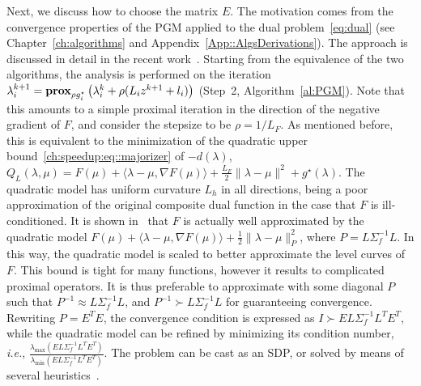 \documentclass[openany]{now}
\newcommand{\ie}{{\it i.e.}}
\newcommand{\prox}{\mathop{\bf prox}}
\begin{document}
  Next, we discuss how to choose the matrix $E$. The motivation comes from the convergence properties of the PGM applied to the dual problem~\eqref{eq:dual} (see Chapter~\ref{ch:algorithms} and Appendix~\ref{App::AlgsDerivations}). The approach is discussed in detail in the recent work~\cite{Giselsson:fbds}. Starting from the equivalence of the two algorithms, the analysis is performed on the iteration $\lambda_i^{k+1} = \prox_{\rho g_i^\star}\left(\lambda_i^k+\rho(L_iz^{k+1}+l_i)\right)$ (Step~2, Algorithm~\ref{al:PGM}). Note that this amounts to a simple proximal iteration in the direction of the negative gradient of $F$, and consider the stepsize to be $\rho=1/L_F$. As mentioned before, this is equivalent to the minimization of the quadratic upper bound~\eqref{ch:speedup:eq::majorizer} of $-d(\lambda)$, $Q_L(\lambda,\mu) = F(\mu) + \langle \lambda-\mu,\nabla F(\mu)\rangle + \frac{L_F}{2}\|\lambda-\mu\|^2 + g^\star(\lambda)$. The quadratic model has uniform curvature $L_h$ in all directions, being a poor approximation of the original composite dual function in the case that $F$ is ill-conditioned. It is shown in~\cite[Proposition~29]{Giselsson:fbds} that $F$ is actually well approximated by the quadratic model $F(\mu) + \langle \lambda-\mu,\nabla F(\mu)\rangle + \frac{1}{2}\|\lambda-\mu\|_P^2$, where $P=L\Sigma_f^{-1}L$. In this way, the quadratic model is scaled to better approximate the level curves of $F$. 
This bound is tight for many functions, however it results to complicated proximal operators. It is thus preferable to approximate with some diagonal $P$ such that $P^{-1}\approx L\Sigma_f^{-1}L$, and $P^{-1}\succ L\Sigma_f^{-1}L$ for guaranteeing convergence. Rewriting $P=E^TE$, the convergence condition is expressed as $I\succ EL\Sigma_f^{-1}L^TE^T$, while the quadratic model can be refined by minimizing its condition number, \ie, $\frac{\lambda_{\max}(EL\Sigma_f^{-1}L^TE^T)}{\lambda_{\min}(EL\Sigma_f^{-1}L^TE^T)}$.
The problem can be cast as an SDP, or solved by means of several heuristics~\cite[Section~6]{Giselsson:fbds}.
\end{document}
